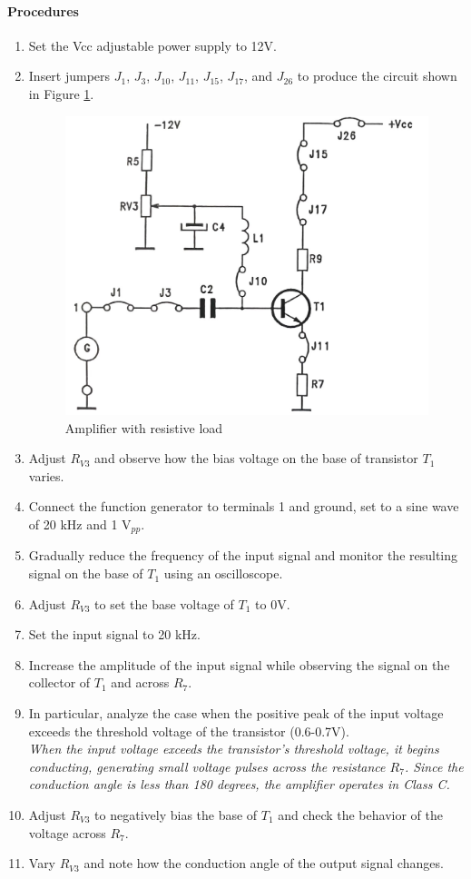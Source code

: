 \documentclass[12pt,a4paper]{article}
\begin{document}
    \paragraph{Procedures}
    \begin{enumerate}
        \item Set the Vcc adjustable power supply to 12V.
        \item Insert jumpers $J_1$, $J_3$, $J_{10}$, $J_{11}$, $J_{15}$, $J_{17}$, and $J_{26}$ to produce the circuit shown in Figure \ref{fig:B32.2}.
        \begin{figure}[H]
            \centering
            \includegraphics[width=0.5\linewidth]{analogue2_2.jpeg}
            \caption{Amplifier with resistive load}
            \label{fig:B32.2}
        \end{figure}
        \item Adjust $R_{V3}$ and observe how the bias voltage on the base of transistor $T_1$ varies.
        \item Connect the function generator to terminals 1 and ground, set to a sine wave of 20 kHz and 1 V$_{pp}$.
        \item Gradually reduce the frequency of the input signal and monitor the resulting signal on the base of $T_1$ using an oscilloscope.
        \item Adjust $R_{V3}$ to set the base voltage of $T_1$ to 0V.
        \item Set the input signal to 20 kHz.
        \item Increase the amplitude of the input signal while observing the signal on the collector of $T_1$ and across $R_7$.
        \item In particular, analyze the case when the positive peak of the input voltage exceeds the threshold voltage of the transistor (0.6-0.7V). \\
        \textit{When the input voltage exceeds the transistor’s threshold voltage, it begins conducting, generating small voltage pulses across the resistance $R_7$. Since the conduction angle is less than 180 degrees, the amplifier operates in Class C.}
        \item Adjust $R_{V3}$ to negatively bias the base of $T_1$ and check the behavior of the voltage across $R_7$.
        \item Vary $R_{V3}$ and note how the conduction angle of the output signal changes.
    \end{enumerate}
\end{document}
